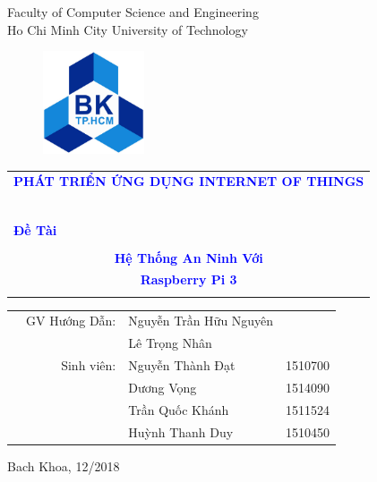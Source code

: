 \documentclass[a4paper]{article}
\begin{document}
\begin{titlepage}
\begin{center}
Faculty of Computer Science and Engineering\\
Ho Chi Minh City University of Technology
\end{center}

\vspace{.51cm}

\begin{figure}[h!]
\begin{center}
\includegraphics[width=3cm]{LogoBK.jpg}
\end{center}
\end{figure}

\vspace{0.5cm}


\begin{center}
\begin{tabular}{c}
\multicolumn{1}{l}{\textbf{{\Large \textcolor{blue}{PHÁT TRIỂN ỨNG DỤNG INTERNET OF THINGS}}}}\\
~~\\
\hline
\\
\multicolumn{1}{l}{\textbf{{\Large \textcolor{blue}{Đề Tài}}}}\\
\\
\textbf{{\Huge \textcolor{blue}{Hệ Thống An Ninh Với}}} \\
\textbf{{\Huge \textcolor{blue}{Raspberry Pi 3}}}\\
\\
\hline
\end{tabular}
\end{center}

\vspace{3cm}

\begin{table}[h]
\begin{tabular}{rrll}
\hspace{5 cm} & GV Hướng Dẫn: & Nguyễn Trần Hữu Nguyên&\\
& & Lê Trọng Nhân & \\
& Sinh viên: & Nguyễn Thành Đạt & 1510700 \\
& & Dương Vọng & 1514090 \\ 
& & Trần Quốc Khánh & 1511524\\ 
& & Huỳnh Thanh Duy& 1510450\\ 
\end{tabular}
\end{table}

\begin{center}
{\footnotesize Bach Khoa, 12/2018}
\end{center}
\end{titlepage}
\end{document}
